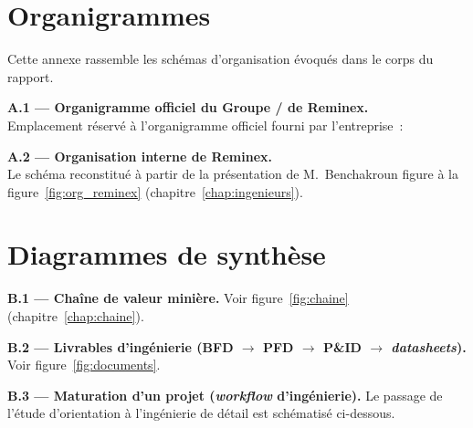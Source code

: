 \begin{appendices}

\chapter{Organigrammes}
\label{ann:organigrammes}

Cette annexe rassemble les schémas d'organisation évoqués dans le corps du rapport.

\vspace{4mm}
\textbf{A.1 --- Organigramme officiel du Groupe / de Reminex.}\\
Emplacement réservé à l'organigramme officiel fourni par l'entreprise~:

\begin{center}
\end{center}

\vspace{4mm}
\textbf{A.2 --- Organisation interne de Reminex.}\\
Le schéma reconstitué à partir de la présentation de M.~Benchakroun figure à la figure~\ref{fig:org_reminex} (chapitre~\ref{chap:ingenieurs}).

\chapter{Diagrammes de synthèse}
\label{ann:diagrammes}

\textbf{B.1 --- Chaîne de valeur minière.} Voir figure~\ref{fig:chaine} (chapitre~\ref{chap:chaine}).

\textbf{B.2 --- Livrables d'ingénierie (BFD $\rightarrow$ PFD $\rightarrow$ P\&ID $\rightarrow$ \textit{datasheets}).} Voir figure~\ref{fig:documents}.

\textbf{B.3 --- Maturation d'un projet (\textit{workflow} d'ingénierie).} Le passage de l'étude d'orientation à l'ingénierie de détail est schématisé ci-dessous.

\begin{center}
\end{center}


\end{appendices}
